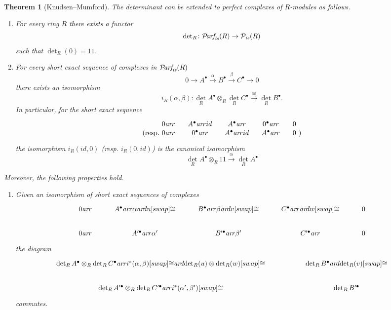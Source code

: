 \documentclass[10pt,a4paper,oneside,draft]{article}
\newcommand{\bone}{1\!\!1}
\newcommand{\Parf}{\mathcal{P}\!\text{\it arf}}
\renewcommand{\det}{\operatorname{det}}
\newcommand{\ar}{\text{\it ar}}
\newcommand{\is}{\text{\it is}}
\theoremstyle{myplain}
\newtheorem{theorem}{Theorem}[section]
\theoremstyle{mydefinition}
\numberwithin{equation}{section}
\begin{document}
\begin{appendices}
\begin{theorem}[Knudsen--Mumford]
  The determinant can be extended to perfect complexes of $R$-modules as
  follows.

  \begin{enumerate}
  \item[I)] For every ring $R$ there exists a functor
    $$\det_R\colon \Parf_\is (R) \to \mathcal{P}_\is (R)$$
    such that $\det_R (0) = \bone$.

  \item[II)] For every short exact sequence of complexes in $\Parf_\is (R)$
    \[ 0 \to A^\bullet \xrightarrow{\alpha} B^\bullet
      \xrightarrow{\beta} C^\bullet \to 0 \]
    there exists an isomorphism
    \[ i_R (\alpha,\beta)\colon
      \det_R A^\bullet \otimes_R \det_R C^\bullet
      \xrightarrow{\cong} \det_R B^\bullet. \]
    In particular, for the short exact sequence
    \[ \begin{tikzcd}[column sep=1em]
        &[-1.5em] 0 \ar{r} & A^\bullet \ar{r}{id} & A^\bullet \ar{r} & 0^\bullet \ar{r} & 0 &[-1.5em] \\[-2em]
        \text{(resp.} & 0 \ar{r} & 0^\bullet \ar{r} & A^\bullet \ar{r}{id} & A^\bullet \ar{r} & 0 & \text{)}
      \end{tikzcd} \]
    the isomorphism $i_R (id,0)$ (resp. $i_R (0,id)$) is the canonical isomorphism
    $$\det_R A^\bullet \otimes_R \bone \xrightarrow{\cong} \det_R A^\bullet$$
  \end{enumerate}

  Moreover, the following properties hold.

  \begin{enumerate}
  \item[i)] Given an isomorphism of short exact sequences of complexes
    \[ \begin{tikzcd}
        0 \ar{r} & A^\bullet \ar{r}{\alpha}\ar{d}{u}[swap]{\cong} & B^\bullet \ar{r}{\beta}\ar{d}{v}[swap]{\cong} & C^\bullet \ar{r}\ar{d}{w}[swap]{\cong} & 0 \\
        0 \ar{r} & A'^\bullet \ar{r}{\alpha'} & B'^\bullet \ar{r}{\beta'} & C'^\bullet \ar{r} & 0
      \end{tikzcd} \]
    the diagram
    \[ \begin{tikzcd}[column sep=5em]
        \det_R A^\bullet \otimes_R \det_R C^\bullet \ar{r}{i^* (\alpha,\beta)}[swap]{\cong}\ar{d}{\det_R (u) \otimes \det_R (w)}[swap]{\cong} & \det_R B^\bullet\ar{d}{\det_R (v)}[swap]{\cong} \\
        \det_R A'^\bullet \otimes_R \det_R C'^\bullet \ar{r}{i^* (\alpha',\beta')}[swap]{\cong} & \det_R B'^\bullet
      \end{tikzcd} \]
    commutes.


\end{enumerate}
\end{theorem}
\end{appendices}
\end{document}
